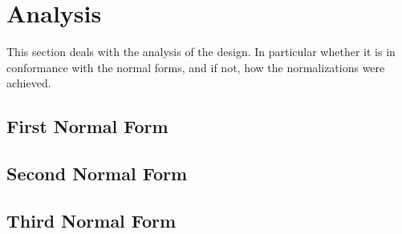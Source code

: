 \section{Analysis}
This section deals with the analysis of the design. In particular whether it is 
in conformance with the normal forms, and if not, how the normalizations were 
achieved. 


\subsection{First Normal Form}


\subsection{Second Normal Form}


\subsection{Third Normal Form}